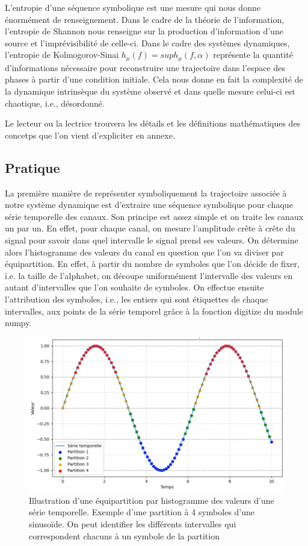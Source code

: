 L'entropie d'une séquence symbolique est une mesure qui nous donne énormément de renseignement. Dans le cadre de la théorie de l'information, l'entropie de Shannon nous renseigne sur la production d'information d'une source et l'imprévisibilité de celle-ci. Dans le cadre des systèmes dynamiques, l'entropie de Kolmogorov-Sinai $h_{\mu}(f) = sup h_{\mu}(f,\alpha)$ \cite{3} représente la quantité d'informations nécessaire pour reconstruire une trajectoire dans l'espace des phases à partir d'une condition initiale. Cela nous donne en fait la complexité de la dynamique intrinsèque du système observé et dans quelle mesure celui-ci est chaotique, i.e., désordonné. 

\vspace{2ex}
Le lecteur ou la lectrice trouvera les détails et les définitions mathématiques des concetps que l'on vient d'expliciter en annexe.

\subsection{Pratique}

La première manière de représenter symboliquement la trajectoire associée à notre système dynamique est d'extraire une séquence symbolique pour chaque série temporelle des canaux. Son principe est assez simple et on traite les canaux un par un. En effet, pour chaque canal, on mesure l'amplitude crête à crête du signal pour savoir dans quel intervalle le signal prend ses valeurs. On détermine alors l'histogramme des valeurs du canal en question que l'on va diviser par équipartition. En effet, à partir du nombre de symboles que l'on décide de fixer, i.e. la taille de l'alphabet, on découpe uniformément l'intervalle des valeurs en autant d'intervalles que l'on souhaite de symboles. On effectue ensuite l'attribution des symboles, i.e., les entiers qui sont étiquettes de chaque intervalles, aux points de la série temporel grâce à la fonction digitize du module numpy. 

\begin{figure}[!ht]
    \centering
    \includegraphics[width=13cm]{partition_serie_temporelle.png}
    \caption{Illustration d'une équipartition par histogramme des valeurs d'une série temporelle. Exemple d'une partition à 4 symboles d'une sinusoïde. On peut identifier les différents intervalles qui correspondent chacuns à un symbole de la partition}
    \label{fig4.2}
\end{figure}


